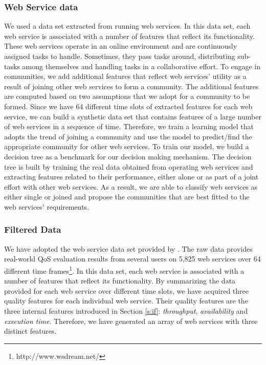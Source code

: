 \documentclass[10pt,journal,cspaper,compsoc]{IEEEtran}
\begin{document}
\subsubsection{Web Service data}\label{sss:webservices}

We used a data set extracted from running web services. In this data set, each web service is associated with a number of features that reflect its functionality. These web services operate in an online environment and are continuously assigned tasks to handle. Sometimes, they pass tasks around, distributing sub-tasks among themselves and handling tasks in a collaborative effort. To engage in communities, we add additional features that reflect web services' utility as a result of joining other web services to form a community. The additional features are computed based on two assumptions that we adopt for a community to be formed. Since we have 64 different time slots of extracted features for each web service, we can build a synthetic data set that contains features of a large number of web services in a sequence of time. Therefore, we train a learning model that adopts the trend of joining a community and use the model to predict/find the appropriate community for other web services. To train our model, we build a decision tree as a benchmark for our decision making mechanism. The decision tree is built by training the real data obtained from operating web services and extracting features related to their performance, either alone or as part of a joint effort with other web services. As a result, we are able to classify web services as either single or joined and propose the communities that are best fitted to the web services' requirements.

\subsubsection{Filtered Data}\label{sss:filtereddata}

We have adopted the web service data set provided by \cite{10.1109/ISSRE.2011.17}. The raw data provides real-world QoS evaluation results from several users on 5,825 web services over 64 different time frames\footnote{http://www.wsdream.net/}. In this data set, each web service is associated with a number of features that reflect its functionality. By summarizing the data provided for each web service over different time slots, we have acquired three quality features for each individual web service. Their quality features are the three internal features introduced in Section \ref{s:if}: \emph{throughput}, \emph{availability} and \emph{execution time}. 
Therefore, we have generated an array of web services with three distinct features. 
\end{document}
